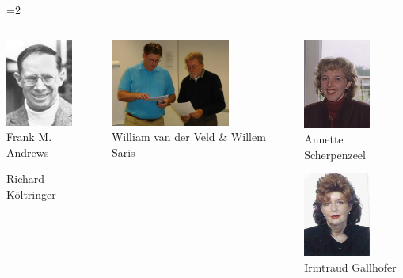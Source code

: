 \documentclass{beamer}
\begin{document}
=2
\begin{frame}
\begin{small}
	\begin{columns}[T]	
		\begin{column}{2.5cm}
			\includegraphics[width=2.2cm]{i/andrews.jpg}\\
			Frank M. Andrews\\	\vspace{.2cm}
			
			\vspace{1cm}
			Richard K\"{o}ltringer			
		
		\end{column}		
		\begin{column}{4cm}
			\includegraphics[width=3.916cm]{i/veldandsaris.jpg}\\
					William	van der Veld \& Willem Saris\\					
			
			
		\end{column}		
		\begin{column}{2.5cm}		
		\includegraphics[width=2.2cm]{i/scherpenzeel.jpg}\\
			Annette Scherpenzeel\\ \vspace{.2cm}
						
		\includegraphics[width=2.2cm]{i/gallhofer.jpg}\\
		 Irmtraud Gallhofer		
		\end{column}		
	\end{columns}
	\end{small}
\end{frame}
\fi
\end{document}

